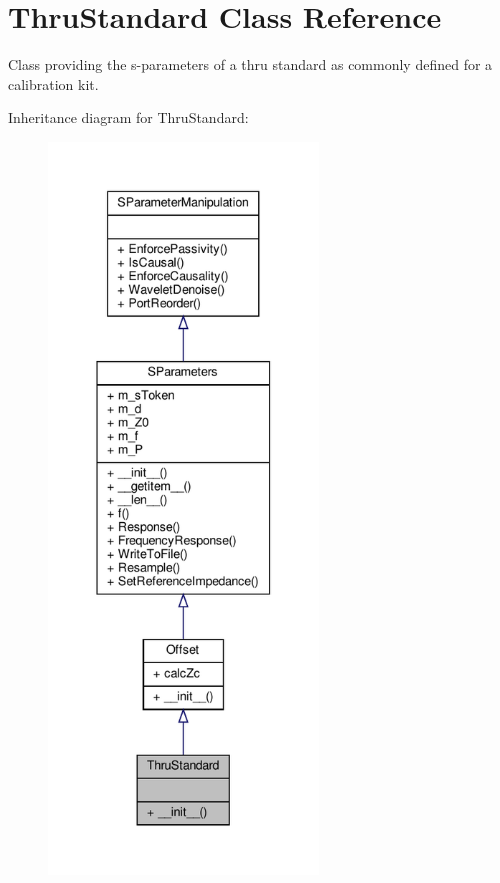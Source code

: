 \hypertarget{classSignalIntegrity_1_1Measurement_1_1CalKit_1_1Standards_1_1ThruStandard_1_1ThruStandard}{}\section{Thru\+Standard Class Reference}
\label{classSignalIntegrity_1_1Measurement_1_1CalKit_1_1Standards_1_1ThruStandard_1_1ThruStandard}


Class providing the s-\/parameters of a thru standard as commonly defined for a calibration kit.  




Inheritance diagram for Thru\+Standard\+:
\nopagebreak
\begin{figure}[H]
\begin{center}
\leavevmode
\includegraphics[height=550pt]{classSignalIntegrity_1_1Measurement_1_1CalKit_1_1Standards_1_1ThruStandard_1_1ThruStandard__inherit__graph}
\end{center}
\end{figure}


